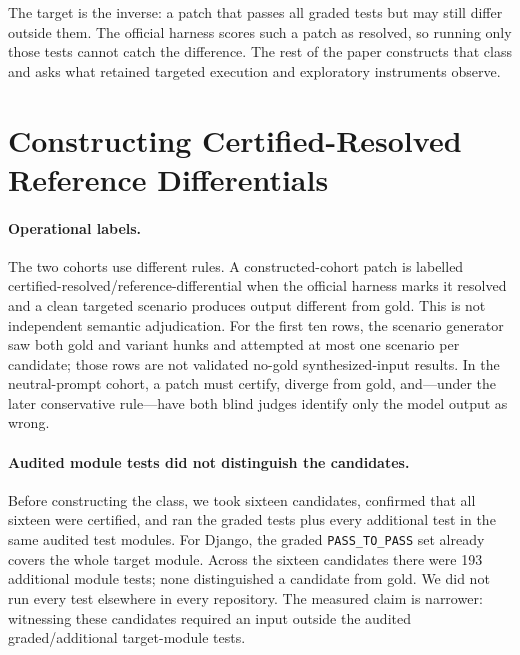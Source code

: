 \documentclass[11pt]{article}
\begin{document}
The target is the inverse: a patch that passes all graded tests but may still differ outside them. The
official harness scores such a patch as resolved, so running only those tests cannot catch the difference.
The rest of the paper constructs that class and asks what retained targeted execution and exploratory
instruments observe.

\section{Constructing Certified-Resolved Reference Differentials}
\label{sec:construct}

\paragraph{Operational labels.} The two cohorts use different rules. A constructed-cohort patch is labelled
certified-resolved/reference-differential when the official harness marks it resolved and a clean targeted
scenario produces output different from gold. This is not independent semantic adjudication. For the first
ten rows, the scenario generator saw both gold and variant hunks and attempted at most one scenario per candidate;
those rows are not validated no-gold synthesized-input results.
In the neutral-prompt cohort, a patch must certify, diverge from gold, and---under the later conservative
rule---have both blind judges identify only the model output as wrong.

\paragraph{Audited module tests did not distinguish the candidates.} Before constructing the class, we
took sixteen candidates, confirmed that all sixteen were certified, and ran the graded tests plus every
additional test in the same audited test modules. For Django, the graded \texttt{PASS\_TO\_PASS} set already
covers the whole target module. Across the sixteen candidates there were 193 additional module tests; none
distinguished a candidate from gold. We did not run every test elsewhere in every repository. The measured
claim is narrower: witnessing these candidates required an input outside the audited graded/additional
target-module tests.
\end{document}

